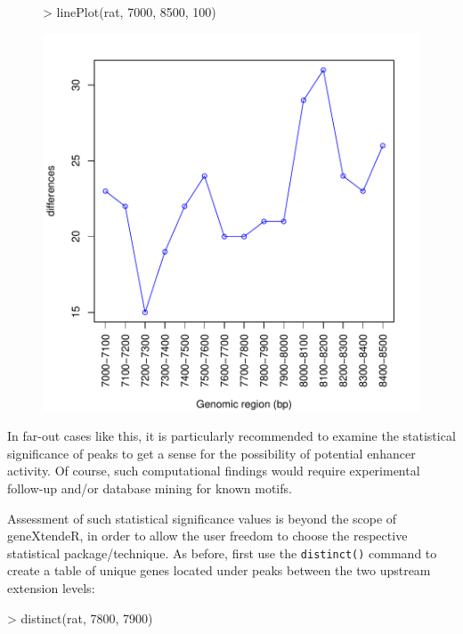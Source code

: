 \documentclass[12pt]{article}
\begin{document}
\begin{figure}[H]
\begin{center}
\begin{Schunk}
\begin{Sinput}
> linePlot(rat, 7000, 8500, 100)
\end{Sinput}
\end{Schunk}
\includegraphics{geneXtendeR-010}
\end{center}
\end{figure}

In far-out cases like this, it is particularly recommended to examine the statistical significance of peaks to get a sense for the possibility of potential enhancer activity.  Of course, such computational findings would require experimental follow-up and/or database mining for known motifs.  

Assessment of such statistical significance values is beyond the scope of geneXtendeR, in order to allow the user freedom to choose the respective statistical package/technique.  As before, first use the \texttt{distinct()} command to create a table of unique genes located under peaks between the two upstream extension levels:

\begin{Schunk}
\begin{Sinput}
> distinct(rat, 7800, 7900)
\end{Sinput}
\end{Schunk}
\end{document}
